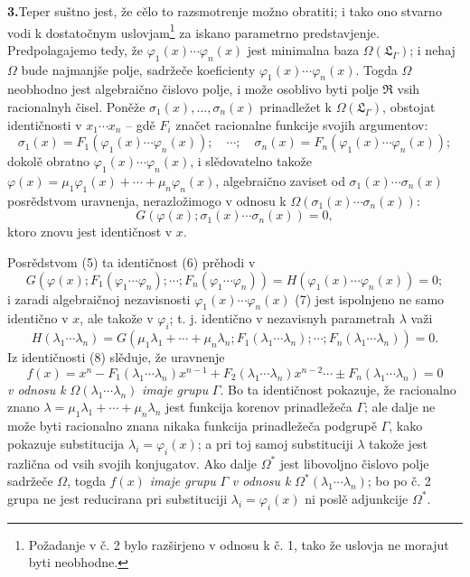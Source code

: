 \documentclass[11pt]{article}
\begin{document}
\noindent\textbf{3.}\quad Teper suštno jest, že cělo to razsmotrenje možno obratiti; i tako ono stvarno vodi k dostatočnym uslovjam\footnote{Požadanje v č. 2 bylo razširjeno v odnosu k č. 1, tako že uslovja ne morajut byti neobhodne.} za iskano parametrno predstavjenje. Predpolagajemo tedy, že $\varphi_1(x)\cdots\varphi_n(x)$ jest minimalna baza $\Omega(\mathfrak L_\Gamma)$; i nehaj $\Omega$ bude najmanjše polje, sadržeče koeficienty $\varphi_1(x)\cdots\varphi_n(x)$. Togda $\Omega$ neobhodno jest algebraično čislovo polje, i može osoblivo byti polje $\mathfrak R$ vsih racionalnyh čisel. Poněže $\sigma_1(x),\ldots,\sigma_n(x)$ prinadležet k $\Omega(\mathfrak L_\Gamma)$, obstojat identičnosti v $x_1\cdots x_n$ -- gdě $F_i$ značet racionalne funkcije svojih argumentov:
\begin{equation}
\sigma_1(x)=F_1(\varphi_1(x)\cdots\varphi_n(x));\quad \cdots;\quad
\sigma_n(x)=F_n(\varphi_1(x)\cdots\varphi_n(x));
\tag{5}
\end{equation}
dokolě obratno $\varphi_1(x)\cdots\varphi_n(x)$, i slědovatelno takože $\varphi(x)=\mu_1\varphi_1(x)+\cdots+\mu_n\varphi_n(x)$, algebraično zaviset od $\sigma_1(x)\cdots\sigma_n(x)$ posrědstvom uravnenja, nerazložimogo v odnosu k $\Omega(\sigma_1(x)\cdots\sigma_n(x))$:
\begin{equation}
G(\varphi(x);\sigma_1(x)\cdots\sigma_n(x))=0,
\tag{6}
\end{equation}
ktoro znovu jest identičnost v $x$.

Posrědstvom (5) ta identičnost (6) prěhodi v
\begin{equation}
G(\varphi(x);F_1(\varphi_1\cdots\varphi_n);\cdots;F_n(\varphi_1\cdots\varphi_n))
=H(\varphi_1(x)\cdots\varphi_n(x))=0;
\tag{7}
\end{equation}
i zaradi algebraičnoj nezavisnosti $\varphi_1(x)\cdots\varphi_n(x)$ (7) jest ispolnjeno ne samo identično v $x$, ale takože v $\varphi_i$; t. j. identično v nezavisnyh parametrah $\lambda$ važi
\begin{equation}
H(\lambda_1\cdots\lambda_n)=G(\mu_1\lambda_1+\cdots+\mu_n\lambda_n;F_1(\lambda_1\cdots\lambda_n);\cdots;F_n(\lambda_1\cdots\lambda_n))=0.
\tag{8}
\end{equation}
Iz identičnosti (8) slěduje, že uravnenje
\begin{equation}
f(x)=x^n-F_1(\lambda_1\cdots\lambda_n)x^{n-1}+F_2(\lambda_1\cdots\lambda_n)x^{n-2}\cdots\pm F_n(\lambda_1\cdots\lambda_n)=0
\tag{9}
\end{equation}
{\itshape v odnosu k} $\Omega(\lambda_1\cdots\lambda_n)$ {\itshape imaje grupu} $\Gamma$. Bo ta identičnost pokazuje, že racionalno znano $\lambda=\mu_1\lambda_1+\cdots+\mu_n\lambda_n$ jest funkcija korenov prinadležeča $\Gamma$; ale dalje ne može byti racionalno znana nikaka funkcija prinadležeča podgrupě $\Gamma$, kako pokazuje substitucija $\lambda_i=\varphi_i(x)$; a pri toj samoj substituciji $\lambda$ takože jest različna od vsih svojih konjugatov. Ako dalje $\Omega^*$ jest libovoljno čislovo polje sadržeče $\Omega$, togda $f(x)$ {\itshape imaje grupu} $\Gamma$ {\itshape v odnosu k} $\Omega^*(\lambda_1\cdots\lambda_n)$; bo po č. 2 grupa ne jest reducirana pri substituciji $\lambda_i=\varphi_i(x)$ ni poslě adjunkcije $\Omega^*$.
\end{document}
